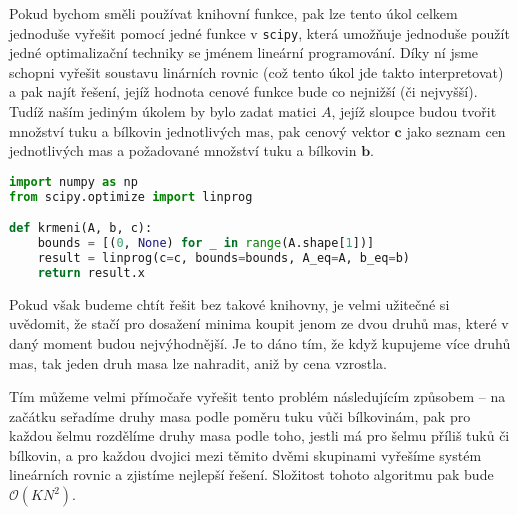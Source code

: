 \documentclass{fkssolpub}
\author{Ondřej Sedláček}
\begin{document}
Pokud bychom směli používat knihovní funkce, pak lze tento úkol
celkem jednoduše vyřešit pomocí jedné funkce v \verb|scipy|, která
umožňuje jednoduše použít jedné optimalizační techniky se jménem
lineární programování. Díky ní jsme schopni vyřešit soustavu linárních
rovnic (což tento úkol jde takto interpretovat) a pak najít řešení,
jejíž hodnota cenové funkce bude co nejnižší (či nejvyšší). Tudíž
naším jediným úkolem by bylo zadat matici $A$, jejíž sloupce budou
tvořit množství tuku a bílkovin jednotlivých mas, pak cenový vektor
$\mathbf{c}$ jako seznam cen jednotlivých mas a požadované množství
tuku a bílkovin $\mathbf{b}$.

\begin{lstlisting}[language=Python]
import numpy as np
from scipy.optimize import linprog

def krmeni(A, b, c):
    bounds = [(0, None) for _ in range(A.shape[1])]
    result = linprog(c=c, bounds=bounds, A_eq=A, b_eq=b)
    return result.x
\end{lstlisting}

Pokud však budeme chtít řešit bez takové knihovny, je velmi užitečné
si uvědomit, že stačí pro dosažení minima koupit jenom ze dvou druhů
mas, které v daný moment budou nejvýhodnější. Je to dáno tím, že
když kupujeme více druhů mas, tak jeden druh masa lze nahradit, aniž
by cena vzrostla.

Tím můžeme velmi přímočaře vyřešit tento problém následujícím 
způsobem -- na začátku seřadíme druhy masa podle poměru tuku vůči
bílkovinám, pak pro každou šelmu rozdělíme druhy masa podle toho,
jestli má pro šelmu příliš tuků či bílkovin, a pro každou dvojici
mezi těmito dvěmi skupinami vyřešíme systém lineárních rovnic
a zjistíme nejlepší řešení. Složitost tohoto algoritmu pak bude
$\mathcal{O}(K N^2)$.
\end{document}
